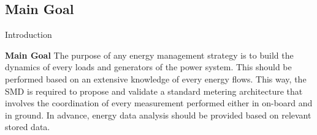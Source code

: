 \subsection{Main Goal}
\begin{frame}{Introduction}{}
\begin{block}{\textbf{Main Goal}}
The purpose of any energy management strategy is to build the dynamics of every loads and generators of the power system. 
This should be performed based on an extensive knowledge of every energy flows. 
This way, the \ac{SMD} is required to propose and validate a standard metering architecture that involves the coordination of every measurement performed either in on-board and in ground. 
In advance, energy data analysis should be provided based on relevant stored data. 

\end{block}
\end{frame}
